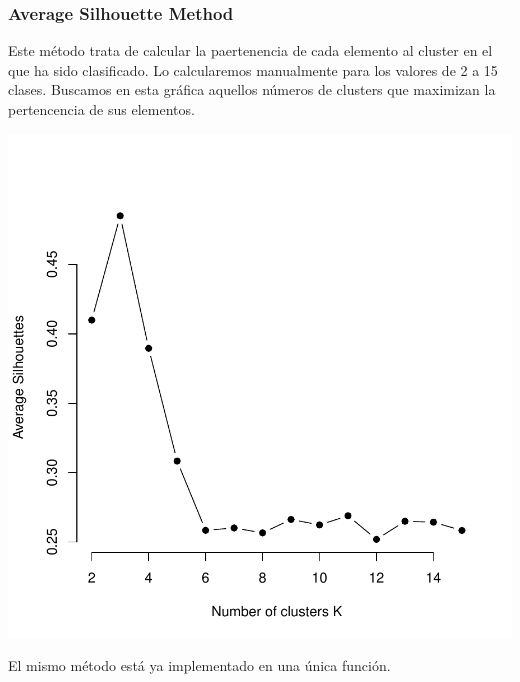 \documentclass [a4paper] {article}
\begin{document}
\subsubsection{Average Silhouette Method}
Este método trata de calcular la paertenencia de cada elemento al cluster en el que ha sido clasificado.
Lo calcularemos manualmente para los valores de 2 a 15 clases.
Buscamos en esta gráfica aquellos números de clusters que maximizan la pertencencia de sus elementos.
\begin{center}
\begin{Schunk}
\end{Schunk}
\includegraphics{entrega-optimal_number_of_clusters_3}
\end{center}
El mismo método está ya implementado en una única función.
\end{document}
